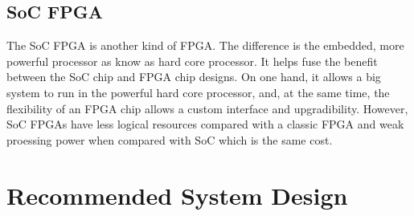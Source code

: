 \documentclass[12pt,article]{memoir}
\begin{document}
\section{SoC FPGA}
The SoC FPGA is another kind of FPGA. The difference is the embedded, more powerful processor as know as hard core processor. It helps fuse the benefit between the SoC chip and FPGA chip designs. On one hand, it allows a big system to run in the powerful hard core processor, and, at the same time, the flexibility of an FPGA chip allows a custom interface and upgradibility. However, SoC FPGAs have less logical resources compared with a classic FPGA and weak proessing power when compared with SoC which is the same cost.
\newpage
\chapter{Recommended System Design}
\end{document}
